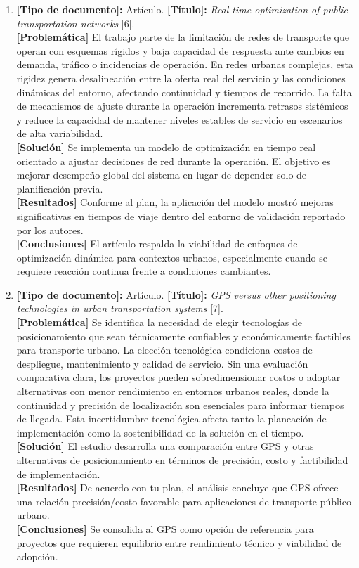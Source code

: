 \begin{enumerate}
    \item \textbf{[Tipo de documento]:} Artículo. \textbf{[Título]:} \textit{Real-time optimization of public transportation networks} [6].\\
    \textbf{[Problemática]} El trabajo parte de la limitaci\'{o}n de redes de transporte que operan con esquemas r\'{i}gidos y baja capacidad de respuesta ante cambios en demanda, tr\'{a}fico o incidencias de operaci\'{o}n. En redes urbanas complejas, esta rigidez genera desalineaci\'{o}n entre la oferta real del servicio y las condiciones din\'{a}micas del entorno, afectando continuidad y tiempos de recorrido. La falta de mecanismos de ajuste durante la operaci\'{o}n incrementa retrasos sist\'{e}micos y reduce la capacidad de mantener niveles estables de servicio en escenarios de alta variabilidad.\\
    \textbf{[Solución]} Se implementa un modelo de optimización en tiempo real orientado a ajustar decisiones de red durante la operación. El objetivo es mejorar desempeño global del sistema en lugar de depender solo de planificación previa.\\
    \textbf{[Resultados]} Conforme al plan, la aplicación del modelo mostró mejoras significativas en tiempos de viaje dentro del entorno de validación reportado por los autores.\\
    \textbf{[Conclusiones]} El artículo respalda la viabilidad de enfoques de optimización dinámica para contextos urbanos, especialmente cuando se requiere reacción continua frente a condiciones cambiantes.

    \item \textbf{[Tipo de documento]:} Artículo. \textbf{[Título]:} \textit{GPS versus other positioning technologies in urban transportation systems} [7].\\
    \textbf{[Problemática]} Se identifica la necesidad de elegir tecnolog\'{i}as de posicionamiento que sean t\'{e}cnicamente confiables y econ\'{o}micamente factibles para transporte urbano. La elecci\'{o}n tecnol\'{o}gica condiciona costos de despliegue, mantenimiento y calidad de servicio. Sin una evaluaci\'{o}n comparativa clara, los proyectos pueden sobredimensionar costos o adoptar alternativas con menor rendimiento en entornos urbanos reales, donde la continuidad y precisión de localizaci\'{o}n son esenciales para informar tiempos de llegada. Esta incertidumbre tecnol\'{o}gica afecta tanto la planeaci\'{o}n de implementaci\'{o}n como la sostenibilidad de la soluci\'{o}n en el tiempo.\\
    \textbf{[Solución]} El estudio desarrolla una comparación entre GPS y otras alternativas de posicionamiento en términos de precisión, costo y factibilidad de implementación.\\
    \textbf{[Resultados]} De acuerdo con tu plan, el análisis concluye que GPS ofrece una relación precisión/costo favorable para aplicaciones de transporte público urbano.\\
    \textbf{[Conclusiones]} Se consolida al GPS como opción de referencia para proyectos que requieren equilibrio entre rendimiento técnico y viabilidad de adopción.


\end{enumerate}
